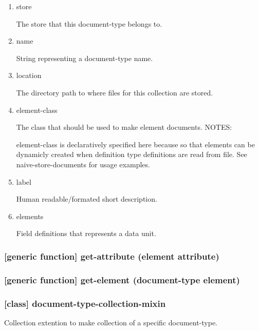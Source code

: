 \documentclass[11pt]{article}
\begin{document}
\begin{enumerate}
\item\relax [accessor] store
\label{sec:org8ccbb92}

The store that this document-type belongs to.

\item\relax [accessor] name
\label{sec:orgebf54e4}

String representing a document-type name.

\item\relax [accessor] location
\label{sec:orgff2ec6d}

The directory path to where files for this collection are stored.

\item\relax [accessor] element-class
\label{sec:org4da890a}

The class that should be used to make element documents.
NOTES:

element-class is declaratively specified here because so that elements
can be dynamicly created when definition type definitions are read
from file. See naive-store-documents for usage examples.

\item\relax [accessor] label
\label{sec:orgbc4d06a}

Human readable/formated short description.

\item\relax [accessor] elements
\label{sec:orgcbec5f0}

Field definitions that represents a data unit.
\end{enumerate}

\subsubsection{[generic function] get-attribute (element attribute)}
\label{sec:org15c3594}

\subsubsection{[generic function] get-element (document-type element)}
\label{sec:org3e6528b}


\subsubsection{[class] document-type-collection-mixin}
\label{sec:org6c21367}

Collection extention to make collection of a specific document-type.
\end{document}
